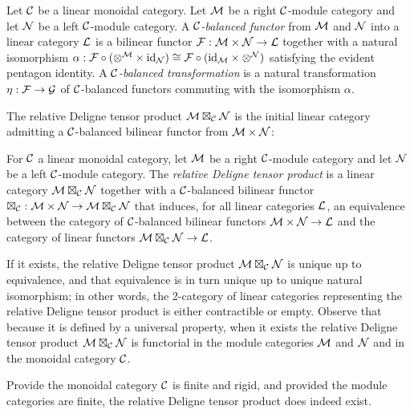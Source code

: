 \documentclass{amsart}
\begin{document}
\begin{definition}
	Let $\mathcal C$ be a linear monoidal category. 
	Let $\mathcal M$ be a right $\mathcal C$-module category and let $\mathcal N$ be a left $\mathcal C$-module category. A {\em $\mathcal C$-balanced functor} from $\mathcal M$ and $\mathcal N$ into a linear category $\mathcal L$ is a bilinear functor $\mathcal F: \mathcal M \times \mathcal N \to \mathcal L$ together with a natural isomorphism $\alpha: \mathcal F \circ (\otimes^{\mathcal M} \times \mathrm{id}_{\mathcal N}) \cong \mathcal F \circ (\mathrm{id}_{\mathcal M} \times \otimes^{\mathcal N})$ satisfying the evident pentagon identity. A {\em $\mathcal C$-balanced transformation} is a natural transformation $\eta:\mathcal F \to \mathcal G$ of $\mathcal C$-balanced functors commuting with the isomorphism $\alpha$.
\end{definition}

The relative Deligne tensor product $\mathcal M \boxtimes_\mathcal C \mathcal N$ is the initial linear category admitting a $\mathcal C$-balanced bilinear functor from $\mathcal M \times \mathcal N$:

\begin{definition}
	For $\mathcal C$ a linear monoidal category, let $\mathcal M$ be a right $\mathcal C$-module category and let $\mathcal N$ be a left $\mathcal C$-module category.  The {\em relative Deligne tensor product} is a linear category $\mathcal M \boxtimes_{\mathcal C} \mathcal N$ together with a $\mathcal C$-balanced bilinear functor $\boxtimes_{\mathcal C}: \mathcal M \times \mathcal N \to \mathcal M \boxtimes_{\mathcal C} \mathcal N$ that induces, for all linear categories $\mathcal L$, an equivalence between the category of $\mathcal C$-balanced bilinear functors $\mathcal M \times \mathcal N \to \mathcal L$ and the category of linear functors $\mathcal M \boxtimes_{\mathcal C} \mathcal N \to \mathcal L$. 
\end{definition}

\nid If it exists, the relative Deligne tensor product $\mathcal M \boxtimes_\mathcal C \mathcal N$ is unique up to equivalence, and that equivalence is in turn unique up to unique natural isomorphism; in other words, the 2-category of linear categories representing the relative Deligne tensor product is either contractible or empty.  Observe that because it is defined by a universal property, when it exists the relative Deligne tensor product $\mathcal M \boxtimes_\mathcal C \mathcal N$ is functorial in the module categories $\mathcal M$ and $\mathcal N$ and in the monoidal category $\mathcal C$. %

Provide the monoidal category $\mathcal C$ is finite and rigid, and provided the module categories are finite, the relative Deligne tensor product does indeed exist.
\end{document}
